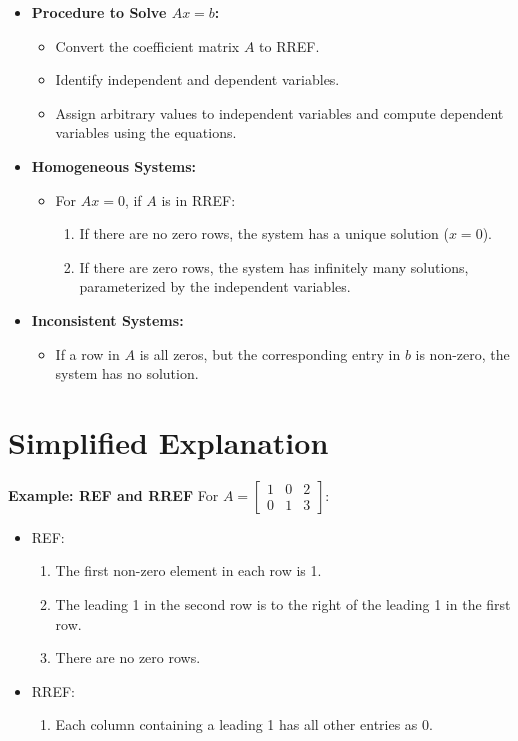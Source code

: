 \documentclass{article}
\begin{document}
\begin{itemize}
  \item \textbf{Procedure to Solve $Ax = b$:}
    \begin{itemize}
      \item Convert the coefficient matrix $A$ to RREF.
      \item Identify independent and dependent variables.
      \item Assign arbitrary values to independent variables and compute dependent variables using the equations.
    \end{itemize}

  \item \textbf{Homogeneous Systems:}
    \begin{itemize}
      \item For $Ax = 0$, if $A$ is in RREF:
        \begin{enumerate}
          \item If there are no zero rows, the system has a unique solution ($x = 0$).
          \item If there are zero rows, the system has infinitely many solutions, parameterized by the independent variables.
        \end{enumerate}
    \end{itemize}

  \item \textbf{Inconsistent Systems:}
    \begin{itemize}
      \item If a row in $A$ is all zeros, but the corresponding entry in $b$ is non-zero, the system has no solution.
    \end{itemize}
\end{itemize}

\section*{Simplified Explanation}

\textbf{Example: REF and RREF}
For $A =
\begin{bmatrix}
  1 & 0 & 2 \\
  0 & 1 & 3
\end{bmatrix}$:
\begin{itemize}
  \item REF:
    \begin{enumerate}
      \item The first non-zero element in each row is 1.
      \item The leading 1 in the second row is to the right of the leading 1 in the first row.
      \item There are no zero rows.
    \end{enumerate}
  \item RREF:
    \begin{enumerate}
      \item Each column containing a leading 1 has all other entries as 0.
    \end{enumerate}
\end{itemize}
\end{document}
